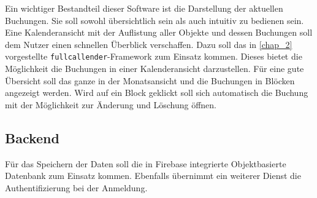 Ein wichtiger Bestandteil dieser Software ist die Darstellung der aktuellen Buchungen. Sie soll sowohl übersichtlich sein als auch intuitiv zu bedienen sein. Eine Kalenderansicht mit der Auflistung aller Objekte und dessen Buchungen soll dem Nutzer einen schnellen Überblick verschaffen. Dazu soll das in \ref{chap_2} vorgestellte  \texttt{fullcallender}-Framework zum Einsatz kommen. Dieses bietet die Möglichkeit die Buchungen in einer Kalenderansicht darzustellen. Für eine gute Übersicht soll das ganze in der Monatsansicht und die Buchungen in Blöcken angezeigt werden.
Wird auf ein Block geklickt soll sich automatisch die Buchung mit der Möglichkeit zur Änderung und Löschung öffnen. 

\subsection{Backend}
Für das Speichern der Daten soll die in Firebase integrierte Objektbasierte Datenbank zum Einsatz kommen. Ebenfalls übernimmt ein weiterer Dienst die Authentifizierung bei der Anmeldung.